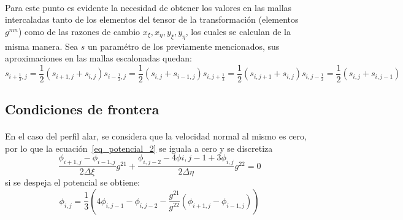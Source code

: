 \documentclass[letterpaper, openright, 12pt]{book}
\begin{document}
    \paragraph*{}
        Para este punto es evidente la necesidad de obtener los valores en las
        mallas intercaladas tanto de los elementos del tensor de la
        transformación (elementos $g^{mn}$) como de las razones de cambio
        $x_\xi, x_\eta, y_\xi, y_\eta$, los cuales se calculan de la misma
        manera. Sea $s$ un paramétro de los previamente mencionados, sus
        aproximaciones en las mallas escalonadas quedan:
        \begin{subequations}
            \begin{equation}
                s_{i + \frac{1}{2}, j} = \frac{1}{2} \left( s_{i+1, j}
                        + s_{i, j}\right)
            \end{equation}
            \begin{equation}
                s_{i - \frac{1}{2}, j} = \frac{1}{2} \left( s_{i, j}
                        + s_{i-1, j}\right)
            \end{equation}
            \begin{equation}
                s_{i, j + \frac{1}{2}} = \frac{1}{2} \left( s_{i, j+1}
                        + s_{i, j}\right)
            \end{equation}
            \begin{equation}
                s_{i, j - \frac{1}{2}} = \frac{1}{2} \left( s_{i, j}
                        + s_{i, j-1}\right)
            \end{equation}
        \end{subequations}

    \subsection{Condiciones de frontera}
    \paragraph*{}
        En el caso del perfil alar, se considera que la velocidad normal al
        mismo es cero, por lo que la ecuación~\ref{eq_potencial_2} se iguala a
        cero y se discretiza
        \begin{equation}
            \frac{\phi_{i+1, j} - \phi_{i-1, j}}{2 \Delta \xi} g^{21}
            + \frac{\phi_{i, j-2} - 4 \phi{i, j-1} + 3 \phi_{i, j}}{2\Delta \eta}
                    g^{22} = 0
        \end{equation}
        si se despeja el potencial se obtiene:
        \begin{equation}
            \phi_{i, j} = \frac{1}{3} \left(4 \phi_{i, j-1} - \phi_{i, j-2}
                - \frac{g^{21}}{g^{22}} \left( \phi_{i+1, j} - \phi_{i-1, j}
                    \right) \right)
        \end{equation}
\end{document}
